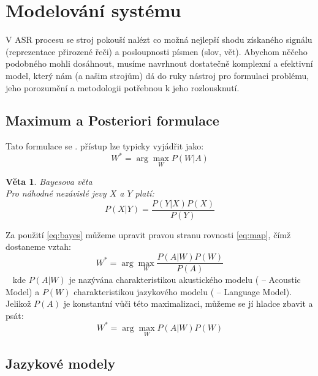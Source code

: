 \section{Modelování systému}

V ASR procesu se stroj pokouší nalézt co možná nejlepší shodu získaného signálu (reprezentace přirozené řeči) a posloupnosti písmen (slov, vět). Abychom něčeho podobného mohli dosáhnout, musíme navrhnout dostatečně komplexní a efektivní model, který nám (a našim strojům) dá do ruky nástroj pro formulaci problému, jeho porozumění a metodologii potřebnou k jeho rozlousknutí.

\subsection{Maximum a Posteriori formulace}

Tato formulace se  \cite{jelinek_2010}.  přístup \cite{bahl_jelinek_1983} lze typicky vyjádřit jako:
%
\begin{equation}
	\label{eq:map}
	W^* = \arg \max_{W} P(W|A)
\end{equation}

\newtheorem{t:bayes}{Věta}
\begin{t:bayes}
Bayesova věta \\
Pro náhodné nezávislé jevy $X$ a $Y$ platí:
\begin{equation}
	\label{eq:bayes}
	P(X|Y) = \frac{P(Y|X) P(X)}{P(Y)}
\end{equation}
\end{t:bayes}

Za použití \ref{eq:bayes} můžeme upravit pravou stranu rovnosti \ref{eq:map}, čímž dostaneme vztah:
%
\begin{equation}
	\label{eq:map2}
	W^* = \arg \max_{W} \frac{P(A|W) P(W)}{P(A)}
\end{equation}\
%
kde $P(A|W)$ je nazývána charakteristikou akustického modelu ( -- Acoustic Model) a $P(W)$ charakteristikou jazykového modelu ( -- Language Model). Jelikož $P(A)$ je konstantní vůči této maximalizaci, můžeme se jí hladce zbavit a psát:
%
\begin{equation}
	\label{eq:map3}
	W^* = \arg \max_{W} P(A|W) P(W)
\end{equation}

\subsection{Jazykové modely}

